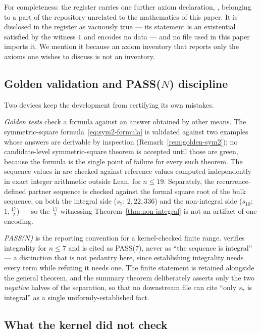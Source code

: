 For completeness: the register carries one further axiom declaration,
, belonging to a part of the repository
unrelated to the mathematics of this paper. It is disclosed in the register as
vacuously true --- its statement is an existential satisfied by the witness
$1$ and encodes no data --- and no file used in this paper imports it. We
mention it because an axiom inventory that reports only the axioms one wishes
to discuss is not an inventory.

\subsection{Golden validation and PASS(\texorpdfstring{$N$}{N}) discipline}

Two devices keep the development from certifying its own mistakes.

\emph{Golden tests} check a formula against an answer obtained by other means.
The symmetric-square formula~\eqref{eq:sym2-formula} is validated against two
examples whose answers are derivable by inspection
(Remark~\ref{rem:golden-sym2}); no candidate-level symmetric-square theorem is
accepted until those are green, because the formula is the single point of
failure for every such theorem. The sequence values in  are
checked against reference values computed independently in exact integer
arithmetic outside Lean, for $n \leq 19$. Separately, the recurrence-defined
partner sequence is checked against the formal square root of the bulk
sequence, on both the integral side ($s_7$: $2, 22, 336$) and the
non-integral side ($s_{10}$: $1, \tfrac{17}{2}$) --- so the $\tfrac{17}{2}$
witnessing Theorem~\ref{thm:non-integral} is not an artifact of one encoding.

\emph{PASS($N$)} is the reporting convention for a kernel-checked finite
range.  verifies integrality for
$n\leq7$ and is cited as PASS(7), never as ``the sequence is integral'' --- a
distinction that is not pedantry here, since establishing integrality needs
every term while refuting it needs one. The finite statement is retained
alongside the general theorem, and the summary theorem
 deliberately asserts only the two
\emph{negative} halves of the separation, so that no downstream file can cite
``only $s_7$ is integral'' as a single uniformly-established fact.

\subsection{What the kernel did not check}\label{subsec:not-checked}

